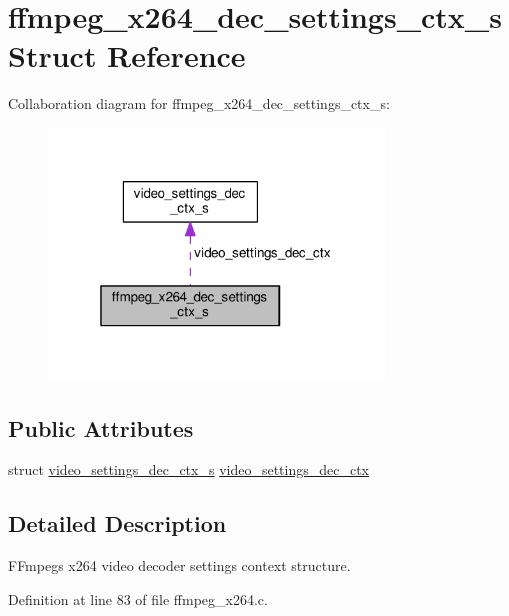 \hypertarget{structffmpeg__x264__dec__settings__ctx__s}{}\section{ffmpeg\+\_\+x264\+\_\+dec\+\_\+settings\+\_\+ctx\+\_\+s Struct Reference}
\label{structffmpeg__x264__dec__settings__ctx__s}


Collaboration diagram for ffmpeg\+\_\+x264\+\_\+dec\+\_\+settings\+\_\+ctx\+\_\+s\+:\nopagebreak
\begin{figure}[H]
\begin{center}
\leavevmode
\includegraphics[width=253pt]{structffmpeg__x264__dec__settings__ctx__s__coll__graph}
\end{center}
\end{figure}
\subsection*{Public Attributes}
\begin{DoxyCompactItemize}
\item 
struct \hyperlink{structvideo__settings__dec__ctx__s}{video\+\_\+settings\+\_\+dec\+\_\+ctx\+\_\+s} \hyperlink{structffmpeg__x264__dec__settings__ctx__s_a9bf740944750421577842bcd7cb9bb78}{video\+\_\+settings\+\_\+dec\+\_\+ctx}
\end{DoxyCompactItemize}


\subsection{Detailed Description}
F\+Fmpeg\textquotesingle{}s x264 video decoder settings context structure. 

Definition at line 83 of file ffmpeg\+\_\+x264.\+c.



